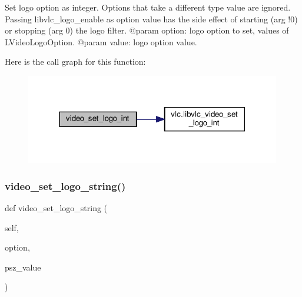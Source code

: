 \begin{DoxyVerb}Set logo option as integer. Options that take a different type value
are ignored.
Passing libvlc_logo_enable as option value has the side effect of
starting (arg !0) or stopping (arg 0) the logo filter.
@param option: logo option to set, values of L{VideoLogoOption}.
@param value: logo option value.
\end{DoxyVerb}
 Here is the call graph for this function\+:
\nopagebreak
\begin{figure}[H]
\begin{center}
\leavevmode
\includegraphics[width=316pt]{classvlc_1_1_media_player_a869914b4d2104458d72b18ec78f08527_cgraph}
\end{center}
\end{figure}
\mbox{\label{classvlc_1_1_media_player_a3554b11f8402f4997f5f6fbed1b22bae}} 
\subsubsection{\texorpdfstring{video\+\_\+set\+\_\+logo\+\_\+string()}{video\_set\_logo\_string()}}
{\footnotesize\ttfamily def video\+\_\+set\+\_\+logo\+\_\+string (\begin{DoxyParamCaption}\item[{}]{self,  }\item[{}]{option,  }\item[{}]{psz\+\_\+value }\end{DoxyParamCaption})}

